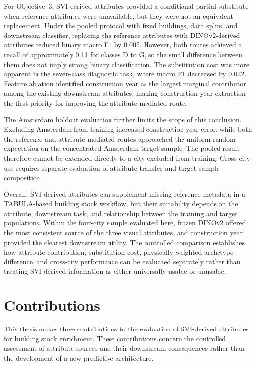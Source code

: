 For Objective~3, \ac{SVI}-derived attributes provided a conditional partial substitute when reference attributes were unavailable, but they were not an equivalent replacement.
Under the pooled protocol with fixed buildings, data splits, and downstream classifier, replacing the reference attributes with DINOv2-derived attributes reduced binary macro F1 by 0.002.
However, both routes achieved a recall of approximately 0.11 for classes D to G, so the small difference between them does not imply strong binary classification.
The substitution cost was more apparent in the seven-class diagnostic task, where macro F1 decreased by 0.022.
Feature ablation identified construction year as the largest marginal contributor among the existing downstream attributes, making construction year extraction the first priority for improving the attribute mediated route.

The Amsterdam holdout evaluation further limits the scope of this conclusion.
Excluding Amsterdam from training increased construction year error, while both the reference and attribute mediated routes approached the uniform random expectation on the concentrated Amsterdam target sample.
The pooled result therefore cannot be extended directly to a city excluded from training.
Cross-city use requires separate evaluation of attribute transfer and target sample composition.

Overall, \ac{SVI}-derived attributes can supplement missing reference metadata in a TABULA-based building stock workflow, but their suitability depends on the attribute, downstream task, and relationship between the training and target populations.
Within the four-city sample evaluated here, frozen DINOv2 offered the most consistent source of the three visual attributes, and construction year provided the clearest downstream utility.
The controlled comparison establishes how attribute contribution, substitution cost, physically weighted archetype difference, and cross-city performance can be evaluated separately rather than treating \ac{SVI}-derived information as either universally usable or unusable.

\section{Contributions}
\label{sec:contributions}

This thesis makes three contributions to the evaluation of \ac{SVI}-derived attributes for building stock enrichment.
These contributions concern the controlled assessment of attribute sources and their downstream consequences rather than the development of a new predictive architecture.

